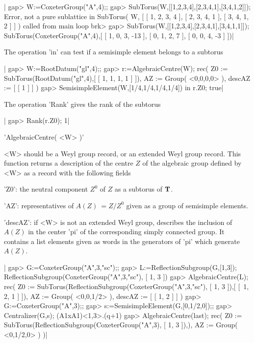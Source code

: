 |    gap> W:=CoxeterGroup("A",4);;
    gap> SubTorus(W,[[1,2,3,4],[2,3,4,1],[3,4,1,2]]);
    Error, not a pure sublattice in
    SubTorus( W, [ [ 1, 2, 3, 4 ], [ 2, 3, 4, 1 ], [ 3, 4, 1, 2 ] ]
     ) called from
    main loop
    brk>
    gap> SubTorus(W,[[1,2,3,4],[2,3,4,1],[3,4,1,1]]);
    SubTorus(CoxeterGroup("A",4),[ [ 1, 0, 3, -13 ], [ 0, 1, 2, 7 ], [ 0,
    0, 4, -3 ] ])|


The operation 'in' can test if a semisimple element belongs to a subtorus\:

|    gap> W:=RootDatum("gl",4);;
    gap> r:=AlgebraicCentre(W);
    rec(
      Z0 := SubTorus(RootDatum("gl",4),[ [ 1, 1, 1, 1 ] ]),
      AZ := Group( <0,0,0,0> ),
      descAZ := [ [ 1 ] ] )
    gap> SemisimpleElement(W,[1/4,1/4,1/4,1/4]) in r.Z0;
    true|

The operation 'Rank' gives the rank of the subtorus\:

|    gap> Rank(r.Z0);
    1|


'AlgebraicCentre( <W> )'

<W>  should be a Weyl group record,  or an extended Weyl group record. This
function  returns a  description of  the centre  $Z$ of the algebraic group
defined by <W> as a record with the following fields\:

'Z0':  the neutral component $Z^0$  of $Z$ as a subtorus of ${\mathbf T}$.

'AZ':  representatives  of  $A(Z)\:=Z/Z^0$  given  as a group of semisimple
elements.

'descAZ':  if <W> is not an extended Weyl group, describes the inclusion of
$A(Z)$  in the center 'pi' of  the corresponding simply connected group. It
contains  a list elements  given as words  in the generators  of 'pi' which
generate $A(Z)$.

|    gap> G:=CoxeterGroup("A",3,"sc");;
    gap> L:=ReflectionSubgroup(G,[1,3]);
    ReflectionSubgroup(CoxeterGroup("A",3,"sc"), [ 1, 3 ])
    gap> AlgebraicCentre(L);
    rec(
      Z0 :=
       SubTorus(ReflectionSubgroup(CoxeterGroup("A",3,"sc"), [ 1, 3 ]),[ [\
     1, 2, 1 ] ]),
      AZ := Group( <0,0,1/2> ),
      descAZ := [ [ 1, 2 ] ] )
    gap> G:=CoxeterGroup("A",3);;
    gap> s:=SemisimpleElement(G,[0,1/2,0]);;
    gap> Centralizer(G,s);
    (A1xA1)<1,3>.(q+1)
    gap> AlgebraicCentre(last);
    rec(
      Z0 := SubTorus(ReflectionSubgroup(CoxeterGroup("A",3), [ 1, 3 ]),),
      AZ := Group( <0,1/2,0> ) )|

